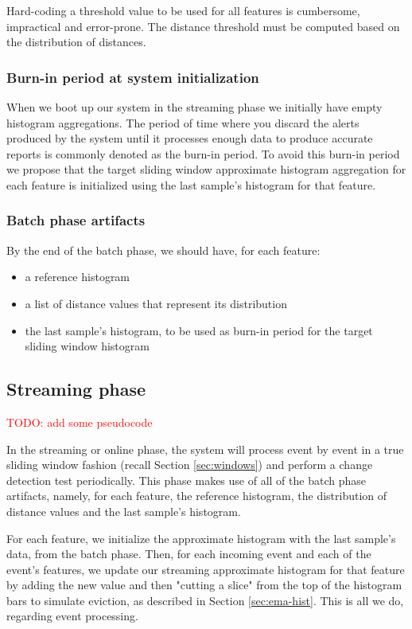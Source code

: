 Hard-coding a threshold value to be used for all features is cumbersome, impractical and error-prone. The distance threshold must be computed based on the distribution of distances.


\subsubsection*{Burn-in period at system initialization}
When we boot up our system in the streaming phase we initially have empty histogram aggregations. The period of time where you discard the alerts produced by the system until it processes enough data to produce accurate reports is commonly denoted as the burn-in period. To avoid this burn-in period we propose that the target sliding window approximate histogram aggregation for each feature is initialized using the last sample's histogram for that feature.

\subsubsection*{Batch phase artifacts} \label{sec:batch-artifacts-summary}
By the end of the batch phase, we should have, for each feature: 
\begin{itemize}
    \item a reference histogram
    \item a list of distance values that represent its distribution
    \item the last sample's histogram, to be used as burn-in period for the target sliding window histogram
\end{itemize}

\subsection{Streaming phase} \label{sec:stream-phase}
\textcolor{red}{TODO: add some pseudocode}

In the streaming or online phase, the system will process event by event in a true sliding window fashion (recall Section \ref{sec:windows}) and perform a change detection test periodically. This phase makes use of all of the batch phase artifacts, namely, for each feature, the reference histogram, the distribution of distance values and the last sample's histogram.

For each feature, we initialize the approximate histogram with the last sample's data, from the batch phase. Then, for each incoming event and each of the event's features, we update our streaming approximate histogram for that feature by adding the new value and then "cutting a slice" from the top of the histogram bars to simulate eviction, as described in Section \ref{sec:ema-hist}. This is all we do, regarding event processing.

